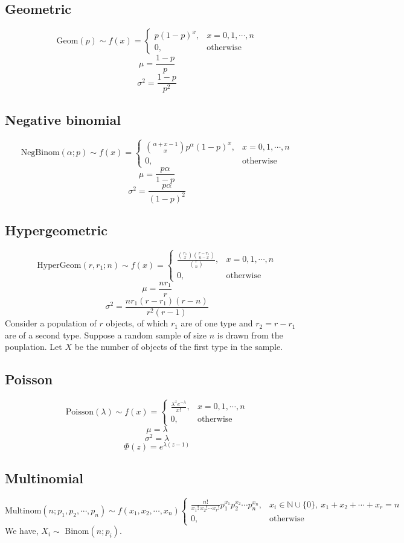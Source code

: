 \documentclass[10pt, a4paper]{extarticle}
\theoremstyle{definition}
\begin{document}
\subsection{Geometric}
\[\text{Geom}(p)\sim f(x)=\begin{cases}
		p(1-p)^x, & x=0,1,\cdots,n   \\
		0,        & \text{otherwise}
	\end{cases}\]
\[\mu=\frac{1-p}{p}\]
\[\sigma^2=\frac{1-p}{p^2}\]

\subsection{Negative binomial}
\[\text{NegBinom}(\alpha;p)\sim f(x)=\begin{cases}
		\binom{\alpha +x-1}{x}p^\alpha(1-p)^x, & x=0,1,\cdots,n   \\
		0,                                     & \text{otherwise}
	\end{cases}\]
\[\mu=\frac{p\alpha}{1-p}\]
\[\sigma^2=\frac{p\alpha}{(1-p)^2}\]

\subsection{Hypergeometric}
\[\text{HyperGeom}(r,r_1;n)\sim f(x)=\begin{cases}
		\frac{\binom{r_1}{x}\binom{r-r_1}{n-x}}{\binom{r}{n}}, & x=0,1,\cdots,n   \\
		0,                                                     & \text{otherwise}
	\end{cases}\]
\[\mu=\frac{nr_1}{r}\]
\[\sigma^2=\frac{nr_1(r-r_1)(r-n)}{r^2(r-1)}\]
Consider a population of $r$ objects, of which $r_1$ are of one type and $r_2=r-r_1$ are of a second type. Suppose a random sample of size $n$ is drawn from the pouplation. Let $X$ be the number of objects of the first type in the sample.

\subsection{Poisson}
\[\text{Poisson}(\lambda)\sim f(x)=\begin{cases}
		\frac{\lambda^xe^{-\lambda}}{x!}, & x=0,1,\cdots,n   \\
		0,                                & \text{otherwise}
	\end{cases}\]
\[\mu=\lambda\]
\[\sigma^2=\lambda\]
\[\Phi(z)=e^{\lambda(z-1)}\]

\subsection{Multinomial}
\[\text{Multinom}(n;p_1,p_2,\cdots,p_n)\sim f(x_1,x_2,\cdots,x_n)
	\begin{cases}
		\frac{n!}{x_1!\ x_2!\cdots x_r!}p_1^{x_1}p_2^{x_2}\cdots p_n^{x_n}, & x_i\in\mathbb{N}\cup\{0\},\ x_1+x_2+\cdots + x_r=n \\
		0,                                                                  & \text{otherwise}
	\end{cases}
\]
We have, $X_i\sim$ Binom$(n;p_i)$.
\end{document}

